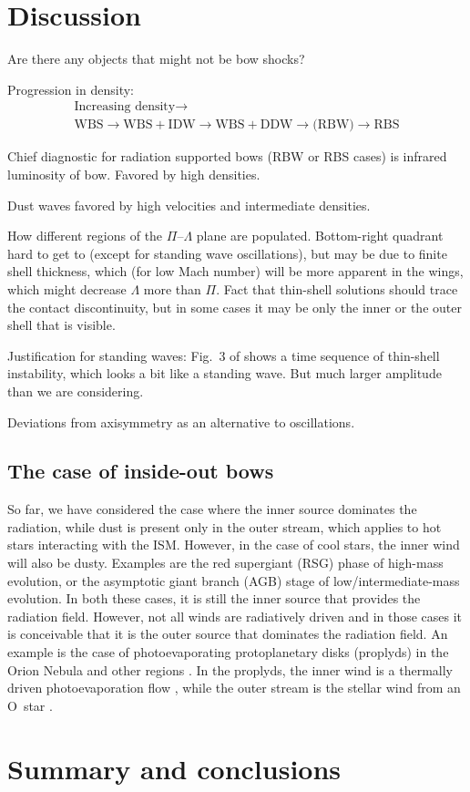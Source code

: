 \section{Discussion}
\label{sec:summary-discussion}

Are there any objects that might not be bow shocks?

Progression in density:
\begin{gather*}
  \text{Increasing density} \longrightarrow \\
  \text{WBS} \to \text{WBS} + \text{IDW} \to \text{WBS} + \text{DDW} \to \text{(RBW)} \to \text{RBS}
\end{gather*}

Chief diagnostic for radiation supported bows (RBW or RBS cases) is
infrared luminosity of bow.  Favored by high densities.

Dust waves favored by high velocities and intermediate densities.







How different regions of the \(\Pi\)--\(\Lambda\) plane are populated.
Bottom-right quadrant hard to get to (except for standing wave
oscillations), but may be due to finite shell thickness, which (for
low Mach number) will be more apparent in the wings, which might
decrease \(\Lambda\) more than \(\Pi\).  Fact that thin-shell solutions should
trace the contact discontinuity, but in some cases it may be only the
inner or the outer shell that is visible.

Justification for standing waves: Fig.~3 of \citet{Meyer:2016a} shows
a time sequence of thin-shell instability, which looks a bit like a
standing wave. But much larger amplitude than we are considering.

Deviations from axisymmetry as an alternative to oscillations. 


\subsection{The case of inside-out bows}
\label{sec:case-inside-out}

So far, we have considered the case where the inner source dominates
the radiation, while dust is present only in the outer stream, which
applies to hot stars interacting with the ISM.  However, in the case
of cool stars, the inner wind will also be dusty.  Examples are the
red supergiant (RSG) phase of high-mass evolution, or the asymptotic
giant branch (AGB) stage of low/intermediate-mass evolution.  In both
these cases, it is still the inner source that provides the radiation
field.  However, not all winds are radiatively driven and in those
cases it is conceivable that it is the outer source that dominates the
radiation field.  An example is the case of photoevaporating
protoplanetary disks (proplyds) in the Orion Nebula and other \hii{}
regions \citep{ODell:1994a}.  In the proplyds, the inner wind is a
thermally driven photoevaporation flow \citep{HA:1998, Henney:1999a},
while the outer stream is the stellar wind from an O~star
\citep{Garcia-Arredondo:2001a}.


\section{Summary and conclusions}
\label{sec:conclusions}



